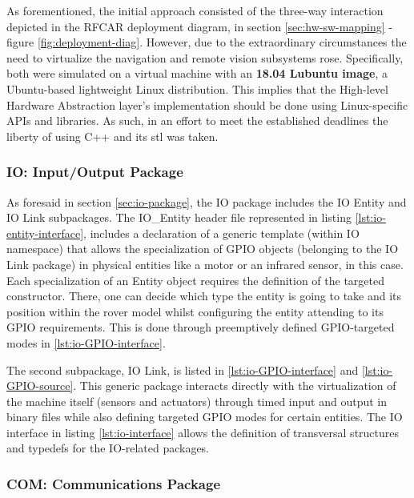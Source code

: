 As forementioned, the initial approach consisted of the three-way interaction depicted in the RFCAR deployment diagram, in section \ref{sec:hw-sw-mapping} - figure \ref{fig:deployment-diag}. However, due to the extraordinary circumstances the need to virtualize the navigation and remote vision subsystems rose. Specifically, both were simulated on a virtual machine with an \textbf{18.04 Lubuntu image}, a Ubuntu-based lightweight Linux distribution. This implies that the High-level Hardware Abstraction layer's implementation should be done using Linux-specific APIs and libraries. As such, in an effort to meet the established deadlines the liberty of using C++ and its \gls{stl} was taken. 
%
\subsubsection{IO: Input/Output Package}
As foresaid in section \ref{sec:io-package}, the IO package includes the IO Entity and IO Link subpackages. The IO\_Entity header file represented in listing \ref{lst:io-entity-interface}, includes a declaration of a generic template (within IO namespace) that allows the specialization of GPIO objects (belonging to the IO Link package) in physical entities like a motor or an infrared sensor, in this case. Each specialization of an Entity object requires the definition of the targeted constructor. There, one can decide which type the entity is going to take and its position within the rover model whilst configuring the entity attending to its GPIO requirements. This is done through preemptively defined GPIO-targeted modes in \ref{lst:io-GPIO-interface}.\par
%
The second subpackage, IO Link, is listed in \ref{lst:io-GPIO-interface} and \ref{lst:io-GPIO-source}. This generic package interacts directly with the virtualization of the machine itself (sensors and actuators) through timed input and output in binary files while also defining targeted GPIO modes for certain entities. The IO interface in listing \ref{lst:io-interface} allows the definition of transversal structures and typedefs for the IO-related packages.
%

%
%
\subsubsection{COM: Communications Package}

%

%

%
